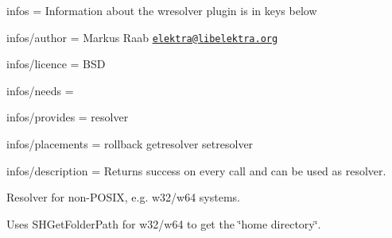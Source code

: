
\begin{DoxyItemize}
\item infos = Information about the wresolver plugin is in keys below
\item infos/author = Markus Raab \href{mailto:elektra@libelektra.org}{\tt elektra@libelektra.\+org}
\item infos/licence = B\+S\+D
\item infos/needs =
\item infos/provides = resolver
\item infos/placements = rollback getresolver setresolver
\item infos/description = Returns success on every call and can be used as resolver.
\end{DoxyItemize}

Resolver for non-\/\+P\+O\+S\+I\+X, e.\+g. w32/w64 systems.

Uses S\+H\+Get\+Folder\+Path for w32/w64 to get the \char`\"{}home directory\char`\"{}. 